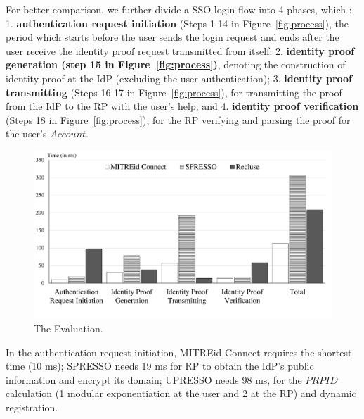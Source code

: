 For better comparison, we further divide a SSO login flow into 4 phases, which : 1. \textbf{authentication request initiation} (Steps 1-14 in Figure~\ref{fig:process}), the period which starts before the user sends the login request and ends after the user receive the identity proof request transmitted from itself.
2. \textbf{identity proof generation (step 15 in Figure~\ref{fig:process})}, denoting the construction of identity proof at the IdP (excluding the user authentication); 3. \textbf{identity proof transmitting} (Steps 16-17 in Figure~\ref{fig:process}), for transmitting the proof from the IdP to the RP with the user's help; and 4. \textbf{identity proof verification} (Steps 18 in Figure~\ref{fig:process}), for the RP  verifying and parsing the proof for the user's $Account$. %



\begin{figure}
  \centering
  \includegraphics[width=\linewidth]{fig/evaluation2.pdf}
  \caption{The Evaluation.}
  \label{fig:evaluation}
\end{figure}
In the authentication request initiation, MITREid Connect requires the shortest time (10 ms); SPRESSO needs 19 ms for RP to obtain the IdP's public information and encrypt its domain; UPRESSO needs 98 ms, for the $PRPID$ calculation (1 modular exponentiation at the user and 2 at the RP) and dynamic registration.

